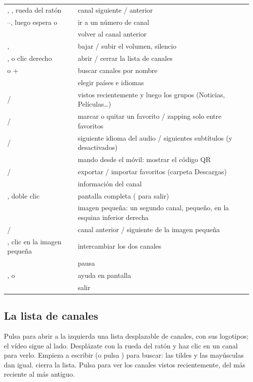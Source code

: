 \begin{xltabular}{\linewidth}{@{}KX@{}}
\key{$\uparrow$} \key{$\downarrow$},  , rueda del ratón & canal siguiente / anterior \\
--, luego espera o  & ir a un número de canal \\
 & volver al canal anterior \\
\key{$\leftarrow$} \key{$\rightarrow$},  & bajar / subir el volumen, silencio \\
,  o clic derecho & abrir / cerrar la lista de canales \\
\key{/} o + & buscar canales por nombre \\
 & elegir países e idiomas \\
 /  & vistos recientemente y luego los grupos (Noticias, Películas\ldots) \\
 /  & marcar o quitar un favorito / zapping solo entre favoritos \\
 /  & siguiente idioma del audio / siguientes subtítulos (y desactivados) \\
 & mando desde el móvil: mostrar el código QR \\
 /  & exportar / importar favoritos (carpeta Descargas) \\
 & información del canal \\
, doble clic & pantalla completa ( para salir) \\
 & imagen pequeña: un segundo canal, pequeño, en la esquina inferior derecha \\
\key{[} / \key{]} & canal anterior / siguiente de la imagen pequeña \\
, clic en la imagen pequeña & intercambiar los dos canales \\
 & pausa \\
,  o  & ayuda en pantalla \\
 & salir \\
\bottomrule
\end{xltabular}

\subsection{La lista de canales}
Pulsa  para abrir a la izquierda una lista desplazable de canales, con
sus logotipos; el vídeo sigue al lado. Desplázate con la rueda del ratón y
haz clic en un canal para verlo. Empieza a escribir (o pulsa \key{/}) para
buscar: las tildes y las mayúsculas dan igual.  cierra la lista.
Pulsa  para ver los canales vistos recientemente, del más reciente al
más antiguo.

